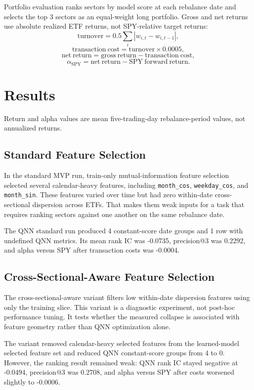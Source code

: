 \documentclass[11pt]{article}
\begin{document}
Portfolio evaluation ranks sectors by model score at each rebalance date and selects the top 3 sectors as an equal-weight long portfolio. Gross and net returns use absolute realized ETF returns, not SPY-relative target returns:
\[
\mathrm{turnover}=0.5 \sum_i |w_{i,t} - w_{i,t-1}|,
\]
\[
\mathrm{transaction\ cost}=\mathrm{turnover} \times 0.0005,
\]
\[
\mathrm{net\ return}=\mathrm{gross\ return} - \mathrm{transaction\ cost},
\]
\[
\alpha_{\mathrm{SPY}}=\mathrm{net\ return}-\mathrm{SPY\ forward\ return}.
\]

\section{Results}

Return and alpha values are mean five-trading-day rebalance-period values, not annualized returns.

\subsection{Standard Feature Selection}

In the standard MVP run, train-only mutual-information feature selection selected several calendar-heavy features, including \texttt{month\_cos}, \texttt{weekday\_cos}, and \texttt{month\_sin}. These features varied over time but had zero within-date cross-sectional dispersion across ETFs. That makes them weak inputs for a task that requires ranking sectors against one another on the same rebalance date.

The QNN standard run produced 4 constant-score date groups and 1 row with undefined QNN metrics. Its mean rank IC was -0.0735, precision@3 was 0.2292, and alpha versus SPY after transaction costs was -0.0004.

\subsection{Cross-Sectional-Aware Feature Selection}

The cross-sectional-aware variant filters low within-date dispersion features using only the training slice. This variant is a diagnostic experiment, not post-hoc performance tuning. It tests whether the measured collapse is associated with feature geometry rather than QNN optimization alone.

The variant removed calendar-heavy selected features from the learned-model selected feature set and reduced QNN constant-score groups from 4 to 0. However, the ranking result remained weak: QNN rank IC stayed negative at -0.0494, precision@3 was 0.2708, and alpha versus SPY after costs worsened slightly to -0.0006.
\end{document}
